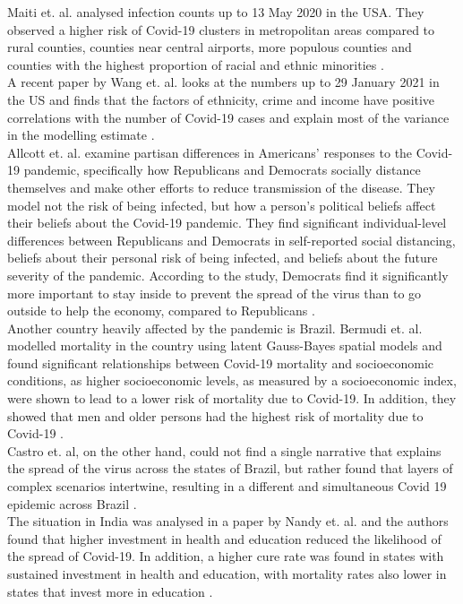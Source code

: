 Maiti et. al. analysed infection counts up to 13 May 2020 in the USA. They observed a higher risk of Covid-19 clusters in metropolitan areas compared to rural counties, counties near central airports, more populous counties and counties with the highest proportion of racial and ethnic minorities \autocite[][]{maiti2021exploring}. \\
A recent paper by Wang et. al. looks at the numbers up to 29 January 2021 in the US and finds that the factors of ethnicity, crime and income have positive correlations with the number of Covid-19 cases and explain most of the variance in the modelling estimate \autocite[][]{wang2021spatiotemporal}. \\
Allcott et. al. examine partisan differences in Americans' responses to the Covid-19 pandemic, specifically how Republicans and Democrats socially distance themselves and make other efforts to reduce transmission of the disease. They model not the risk of being infected, but how a person's political beliefs affect their beliefs about the Covid-19 pandemic. They find significant individual-level differences between Republicans and Democrats in self-reported social distancing, beliefs about their personal risk of being infected, and beliefs about the future severity of the pandemic. According to the study, Democrats find it significantly more important to stay inside to prevent the spread of the virus than to go outside to help the economy, compared to Republicans \autocite[][]{allcott2020polarization}. \\
Another country heavily affected by the pandemic is Brazil. Bermudi et. al. modelled mortality in the country using latent Gauss-Bayes spatial models and found significant relationships between Covid-19 mortality and socioeconomic conditions, as higher socioeconomic levels, as measured by a socioeconomic index, were shown to lead to a lower risk of mortality due to Covid-19. In addition, they showed that men and older persons had the highest risk of mortality due to Covid-19 \autocite[][]{bermudi2021spatiotemporal}. \\
Castro et. al, on the other hand, could not find a single narrative that explains the spread of the virus across the states of Brazil, but rather found that layers of complex scenarios intertwine, resulting in a different and simultaneous Covid 19 epidemic across Brazil \autocite[][]{castro2021spatiotemporal}. \\
The situation in India was analysed in a paper by Nandy et. al. and the authors found that higher investment in health and education reduced the likelihood of the spread of Covid-19. In addition, a higher cure rate was found in states with sustained investment in health and education, with mortality rates also lower in states that invest more in education \autocite[][]{nandy2021managing}. \\
